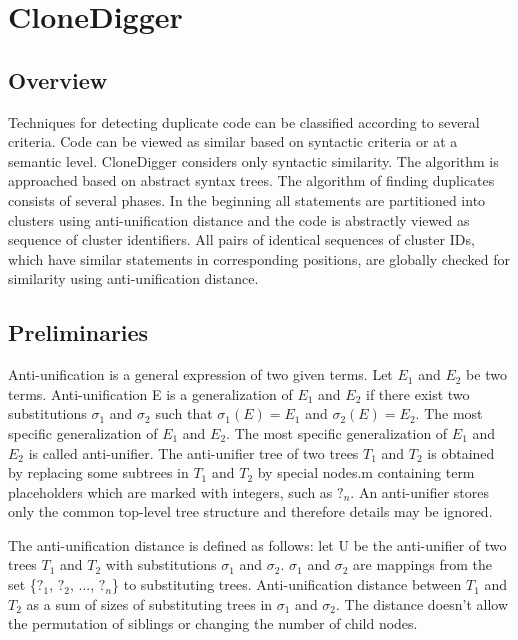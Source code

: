 \documentclass{acm_proc_article-sp}
\begin{document}
\section{CloneDigger}
\subsection{Overview}
Techniques for detecting duplicate code can be classified according to several criteria. Code can be viewed as similar based on syntactic criteria or at a semantic level. CloneDigger considers only syntactic similarity. The algorithm is approached based on abstract syntax trees. The algorithm of finding duplicates consists of several phases. In the beginning all statements are partitioned into clusters using anti-unification distance and the code is abstractly viewed as sequence of cluster identifiers. All pairs of identical sequences of cluster IDs, which have similar statements in corresponding positions, are globally checked for similarity using anti-unification distance.


\subsection{Preliminaries}
Anti-unification is a general expression of two given terms. Let $E_{1}$ and $E_{2}$ be two terms. Anti-unification E is a generalization of $E_{1}$ and $E_{2}$ if there exist two substitutions $\sigma_{1}$ and $\sigma_{2}$ such that $\sigma_{1}(E)=E_{1}$ and $\sigma_{2}(E)=E_{2}$. The most specific generalization of $E_{1}$ and $E_{2}$. The most specific generalization of $E_{1}$ and $E_{2}$ is called anti-unifier. The anti-unifier tree of two trees $T_{1}$ and $T_{2}$ is obtained by replacing some subtrees in $T_{1}$ and $T_{2}$ by special nodes.m containing term placeholders which are marked with integers, such as $?_{n}$. An anti-unifier stores only the common top-level tree structure and therefore details may be ignored.

The anti-unification distance is defined as follows: let U be the anti-unifier of two trees $T_{1}$ and $T_{2}$ with substitutions $\sigma_{1}$ and $\sigma_{2}$. $\sigma_{1}$ and $\sigma_{2}$ are mappings from the set \{$?_{1}$, $?_{2}$, ..., $?_{n}$\} to substituting trees. Anti-unification distance between $T_{1}$ and $T_{2}$ as a sum of sizes of substituting trees in $\sigma_{1}$ and $\sigma_{2}$. The distance doesn't allow the permutation of siblings or changing the number of child nodes.
\end{document}
